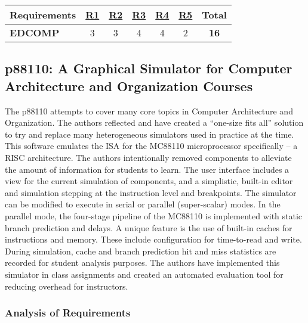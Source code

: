 \begin{table}[h!]
    \centering
    \begin{tabular}{lcccccc}
        \textbf{Requirements} & \textbf{\hyperref[req:personal]{R1}} & \textbf{\hyperref[req:configuration]{R2}} & \textbf{\hyperref[req:pedagogical]{R3}} & \textbf{\hyperref[req:simulations]{R4}} & \textbf{\hyperref[req:modern]{R5}} & \textbf{Total} \\ \hline
       \textbf{EDCOMP}          & 3                                  & 3                                    & 4                            & 4                                  & 2                             & \textbf{16}    \\ 
    \end{tabular}
\end{table}

\subsection{p88110: A Graphical Simulator for Computer Architecture and Organization Courses}
\label{sec:review-p88110}

The p88110 attempts to cover many core topics in Computer Architecture and Organization\cite{Garcia2009}. The authors reflected and have created a ``one-size fits all'' solution to try and replace many heterogeneous simulators used in practice at the time. This software emulates the ISA for the MC88110 microprocessor specifically -- a RISC architecture. The authors intentionally removed components to alleviate the amount of information for students to learn. The user interface includes a view for the current simulation of components, and a simplistic, built-in editor and simulation stepping at the instruction level and breakpoints. The simulator can be modified to execute in serial or parallel (super-scalar) modes. In the parallel mode, the four-stage pipeline of the MC88110 is implemented with static branch prediction and delays. A unique feature is the use of built-in caches for instructions and memory. These include configuration for time-to-read and write. During simulation, cache and branch prediction hit and miss statistics are recorded for student analysis purposes. The authors have implemented this simulator in class assignments and created an automated evaluation tool for reducing overhead for instructors. 

\subsubsection*{Analysis of Requirements}

